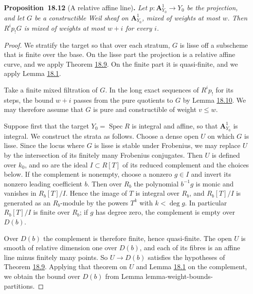 \documentclass[11pt]{article}
\newenvironment{bpstatement}[2]{\par\addvspace{0.6\baselineskip}\noindent\textbf{#1}#2\textbf{.}\enspace\ignorespaces}
  {\par\addvspace{0.4\baselineskip}}
\newenvironment{bpstatementit}[2]{\begin{bpstatement}{#1}{#2}\itshape\ignorespaces}{\end{bpstatement}}
\begin{document}
\label{bp308}%
\begin{bpstatementit}{Proposition~18.12}{ (A relative affine line)}
Let \(p:\mathbf A^1_{Y_0}\to Y_0\) be the projection, and let \(G\) be a constructible Weil sheaf on \(\mathbf A^1_{Y_0}\), mixed of weights at most \(w\). Then \(R^ip_!G\) is mixed of weights at most \(w+i\) for every \(i\).
\end{bpstatementit}

\begin{proof}[{Proof}]\label{bp309}%
We stratify the target so that over each stratum, \(G\) is lisse off a subscheme that is finite over the base. On the lisse part the projection is a relative affine curve, and we apply Theorem \hyperref[bp299]{18.9}. On the finite part it is quasi-finite, and we apply Lemma \hyperref[bp275]{18.1}.

Take a finite mixed filtration of \(G\). In the long exact sequences of \(R^ip_!\) for its steps, the bound \(w+i\) passes from the pure quotients to \(G\) by Lemma \hyperref[bp303]{18.10}. We may therefore assume that \(G\) is pure and constructible of weight \(v\leq w\).

Suppose first that the target \(Y_0=\operatorname{Spec}R\) is integral and affine, so that \(\mathbf A^1_{Y_0}\) is integral. We construct the strata as follows. Choose a dense open \(U\) on which \(G\) is lisse. Since the locus where \(G\) is lisse is stable under Frobenius, we may replace \(U\) by the intersection of its finitely many Frobenius conjugates. Then \(U\) is defined over \(k_0\), and so are the ideal \(I\subset R[T]\) of its reduced complement and the choices below. If the complement is nonempty, choose a nonzero \(g\in I\) and invert its nonzero leading coefficient \(b\). Then over \(R_b\) the polynomial \(b^{-1}g\) is monic and vanishes in \(R_b[T]/I\). Hence the image of \(T\) is integral over \(R_b\), and \(R_b[T]/I\) is generated as an \(R_b\)-module by the powers \(T^k\) with \(k<\deg g\). In particular \(R_b[T]/I\) is finite over \(R_b\); if \(g\) has degree zero, the complement is empty over \(D(b)\).

Over \(D(b)\) the complement is therefore finite, hence quasi-finite. The open \(U\) is smooth of relative dimension one over \(D(b)\), and each of its fibres is an affine line minus finitely many points. So \(U\to D(b)\) satisfies the hypotheses of Theorem \hyperref[bp299]{18.9}. Applying that theorem on \(U\) and Lemma \hyperref[bp275]{18.1} on the complement, we obtain the bound over \(D(b)\) from Lemma lemma-weight-bounds-partitions.


\end{proof}
\end{document}
